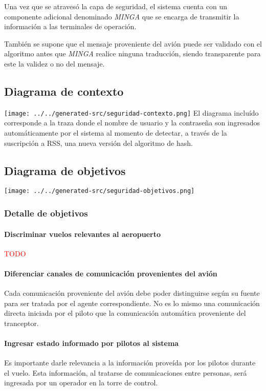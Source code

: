 Una vez que se atravesó la capa de seguridad, el sistema cuenta con un componente adicional denominado \emph{MINGA} que se encarga de transmitir la información a las terminales de operación.

También se supone que el mensaje proveniente del avión puede ser validado con el algoritmo antes que \emph{MINGA} realice ninguna traducción, siendo transparente para este la validez o no del mensaje.

\subsection{Diagrama de contexto}
\texttt{[image: ../../generated-src/seguridad-contexto.png]}
El diagrama incluído corresponde a la traza donde el nombre de usuario y la contraseña son ingresados automáticamente por el sistema al momento de detectar, a través de la suscripción a RSS, una nueva versión del algoritmo de hash.

\subsection{Diagrama de objetivos}
\texttt{[image: ../../generated-src/seguridad-objetivos.png]}

\subsubsection{Detalle de objetivos}
\paragraph{Discriminar vuelos relevantes al aeropuerto}
\textcolor{red}{TODO}
\paragraph{Diferenciar canales de comunicación provenientes del avión}
Cada comunicación proveniente del avión debe poder distinguirse según su fuente para ser tratada por el agente correspondiente. No es lo mismo una comunicación directa iniciada por el piloto que la comunicación automática proveniente del tranceptor.
\paragraph{Ingresar estado informado por pilotos al sistema}
Es importante darle relevancia a la información proveída por los pilotos durante el vuelo. Esta información, al tratarse de comunicaciones entre personas, será ingresada por un operador en la torre de control.
